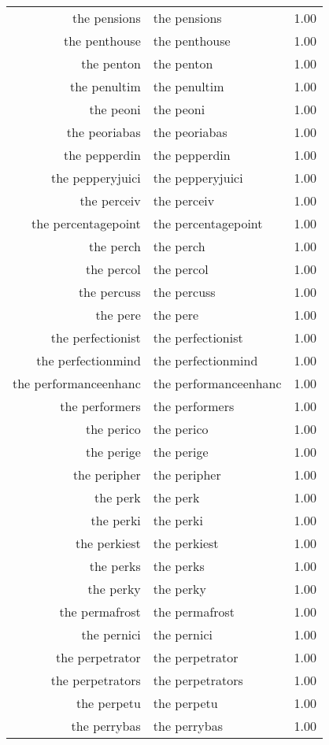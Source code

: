 \begin{table}[ht]
\begin{tabular}{rlr}
  the pensions & the pensions & 1.00 \\ 
  the penthouse & the penthouse & 1.00 \\ 
  the penton & the penton & 1.00 \\ 
  the penultim & the penultim & 1.00 \\ 
  the peoni & the peoni & 1.00 \\ 
  the peoriabas & the peoriabas & 1.00 \\ 
  the pepperdin & the pepperdin & 1.00 \\ 
  the pepperyjuici & the pepperyjuici & 1.00 \\ 
  the perceiv & the perceiv & 1.00 \\ 
  the percentagepoint & the percentagepoint & 1.00 \\ 
  the perch & the perch & 1.00 \\ 
  the percol & the percol & 1.00 \\ 
  the percuss & the percuss & 1.00 \\ 
  the pere & the pere & 1.00 \\ 
  the perfectionist & the perfectionist & 1.00 \\ 
  the perfectionmind & the perfectionmind & 1.00 \\ 
  the performanceenhanc & the performanceenhanc & 1.00 \\ 
  the performers & the performers & 1.00 \\ 
  the perico & the perico & 1.00 \\ 
  the perige & the perige & 1.00 \\ 
  the peripher & the peripher & 1.00 \\ 
  the perk & the perk & 1.00 \\ 
  the perki & the perki & 1.00 \\ 
  the perkiest & the perkiest & 1.00 \\ 
  the perks & the perks & 1.00 \\ 
  the perky & the perky & 1.00 \\ 
  the permafrost & the permafrost & 1.00 \\ 
  the pernici & the pernici & 1.00 \\ 
  the perpetrator & the perpetrator & 1.00 \\ 
  the perpetrators & the perpetrators & 1.00 \\ 
  the perpetu & the perpetu & 1.00 \\ 
  the perrybas & the perrybas & 1.00 \\ 

\end{tabular}
\end{table}
